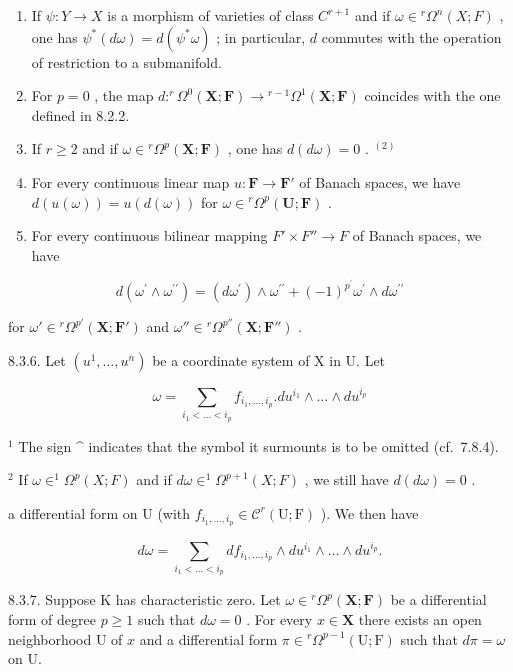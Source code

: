 \begin{enumerate}
\def\labelenumi{(\arabic{enumi})}
\setcounter{enumi}{5}
\item
  If \(\psi: Y \to X\) is a morphism of varieties of class \(C^{r+1}\) and if \(\omega \in {}^r\Omega^n(X; F)\) , one has \(\psi^*(d\omega) = d(\psi^*\omega)\) ; in particular, \(d\) commutes with the operation of restriction to a submanifold.
\item
  For \(p = 0\) , the map \(d: ^r\Omega^0(\mathbf{X}; \mathbf{F}) \to {}^{r-1}\Omega^1(\mathbf{X}; \mathbf{F})\) coincides with the one defined in 8.2.2.
\item
  If \(r \geqslant 2\) and if \(\omega \in {}^r\Omega^p(\mathbf{X};\mathbf{F})\) , one has \(d(d\omega) = 0\) . \(^{(2)}\)
\item
  For every continuous linear map \(u: \mathbf{F} \to \mathbf{F}'\) of Banach spaces, we have \(d(u(\omega)) = u(d(\omega))\) for \(\omega \in {}^{r}\Omega^{p}(\mathbf{U}; \mathbf{F})\) .
\item
  For every continuous bilinear mapping \(F' \times F'' \rightarrow F\) of Banach spaces, we have
\end{enumerate}

\[
d \left(\omega^ {\prime} \wedge \omega^ {\prime \prime}\right) = \left(d \omega^ {\prime}\right) \wedge \omega^ {\prime \prime} + (- 1) ^ {p ^ {\prime}} \omega^ {\prime} \wedge d \omega^ {\prime \prime}
\]

for \(\omega' \in {}^r\Omega^{p'}(\mathbf{X}; \mathbf{F}')\) and \(\omega'' \in {}^r\Omega^{p''}(\mathbf{X}; \mathbf{F}'')\) .


8.3.6. Let \((u^{1},\ldots ,u^{n})\) be a coordinate system of X in U. Let

\[
\omega = \sum_ {i _ {1} <   \dots <   i _ {p}} f _ {i _ {1}, \dots , i _ {p}}. d u ^ {i _ {1}} \wedge \dots \wedge d u ^ {i _ {p}}
\]

\(^{1}\) The sign \^{} indicates that the symbol it surmounts is to be omitted (cf.~7.8.4).

\(^{2}\) If \(\omega\in^{1}\Omega^{p}(X;F)\) and if \(d\omega\in^{1}\Omega^{p+1}(X;F)\) , we still have \(d(d\omega)=0\) .

a differential form on U (with \(f_{i_1,\ldots,i_p} \in \mathcal{C}^r(\mathrm{U};\mathrm{F})\) ). We then have

\[
d \omega = \sum_ {i _ {1} <   \dots <   i _ {p}} d f _ {i _ {1}, \dots , i _ {p}} \wedge d u ^ {i _ {1}} \wedge \dots \wedge d u ^ {i _ {p}}.\tag{11}
\]

8.3.7. Suppose K has characteristic zero. Let \(\omega \in {}^r\Omega^p (\mathbf{X};\mathbf{F})\) be a differential form of degree \(p\geqslant 1\) such that \(d\omega = 0\) . For every \(x\in \mathbf{X}\) there exists an open neighborhood U of \(x\) and a differential form \(\pi \in {}^r\Omega^{p - 1}(\mathrm{U};\mathrm{F})\) such that \(d\pi = \omega\) on U.

